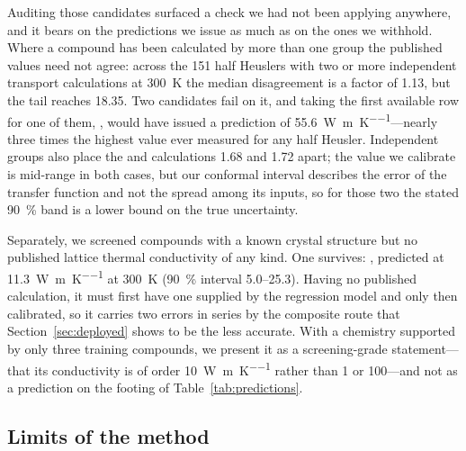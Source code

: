 Auditing those candidates surfaced a check we had not been applying anywhere, and it bears on the
predictions we issue as much as on the ones we withhold. Where a compound has been calculated by
more than one group the published values need not agree: across the \num{151} half Heuslers with
two or more independent transport calculations at \SI{300}{\kelvin} the median disagreement is a
factor of \num{1.13}, but the tail reaches \num{18.35}. Two candidates fail on it, and taking the
first available row for one of them, , would have issued a prediction of
\SI{55.6}{\watt\per\meter\per\kelvin}---nearly three times the highest value ever measured for any
half Heusler. Independent groups also place the  and  calculations \num{1.68}
and \num{1.72} apart; the value we calibrate is mid-range in both cases, but our conformal interval
describes the error of the transfer function and not the spread among its inputs, so for those two
the stated \SI{90}{\percent} band is a lower bound on the true uncertainty.

Separately, we screened compounds with a known crystal structure but no published lattice thermal
conductivity of any kind. One survives: , predicted at
\SI{11.3}{\watt\per\meter\per\kelvin} at \SI{300}{\kelvin} (\SI{90}{\percent} interval
\SIrange{5.0}{25.3}{}). Having no published calculation, it must first have one supplied by the
regression model and only then calibrated, so it carries two errors in series by the composite route
that Section~\ref{sec:deployed} shows to be the less accurate. With a chemistry supported by only
three training compounds, we present it as a screening-grade statement---that its conductivity is of
order \SI{10}{\watt\per\meter\per\kelvin} rather than \num{1} or \num{100}---and not as a prediction
on the footing of Table~\ref{tab:predictions}.

\subsection{Limits of the method}
\label{sec:limitations}

